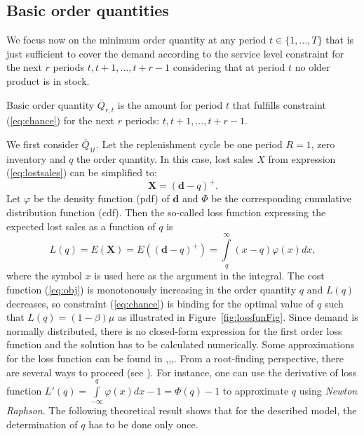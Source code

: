 \subsection{Basic order quantities}
\label{sec:safe}
We focus now on the minimum order quantity at any period $t\in \{1,\ldots,T\}$ that is just sufficient to cover the demand according to the service level constraint for the next $r$ periods $t, t+1,\ldots, t+r-1$ considering that at period $t$ no older product is in stock.
\begin{defn}
Basic order quantity $\overline Q_{r,t}$ is the amount for period $t$ that fulfills constraint (\ref{eq:chance}) for the next $r$ periods: $t,t+1,\ldots,t+r-1$.
\end{defn}
We first consider $\overline Q_{1t}$. Let the replenishment cycle be one period $R=1$, zero inventory and $q$ the order quantity. In this case, lost sales $X$ from expression (\ref{eq:lostsales}) can be simplified to:
%
\begin{equation}
\boldsymbol{X}=\left(\boldsymbol{d}-q\right)^+ .
\end{equation}
Let $\varphi$ be the density function (pdf) of $\boldsymbol d$ and $\Phi$ be the corresponding cumulative distribution function (cdf).
%
Then the so-called loss function expressing the expected lost sales as a function of $q$ is
%
\begin{equation}
L(q) = E(\boldsymbol{X})=E\left((\boldsymbol{d}-q)^+\right)= \int\limits_{q}^{\infty} (x-q)\varphi(x)dx,
\end{equation}
%
where the symbol $x$ is used here as the argument in the integral. The cost function (\ref{eq:obj}) is monotonously increasing in the order quantity $q$ and $L(q)$ decreases, so constraint (\ref{eq:chance}) is binding for the optimal value of $q$ such that $L(q) = (1-\beta) \mu$ as illustrated in Figure~\ref{fig:lossfunFig}. Since demand is normally distributed, there is no closed-form expression for the first order loss function and the solution has to be calculated numerically. Some approximations for the loss function can be found in  \cite{kurawarwala96},\cite{Rossi14},\cite{DeSchrijver20121375},\cite{Waissi199691}. From a root-finding perspective, there are several ways to proceed (see \cite{HENTO10}). For instance, one can use the derivative of loss function  $L'(q)=\int\limits_{-\infty}^{q}\varphi(x)dx - 1 = \Phi(q) - 1$ to approximate $q$ using \emph{Newton Raphson}. The following theoretical result shows that for the described model, the determination of $q$ has to be done only once.
%
